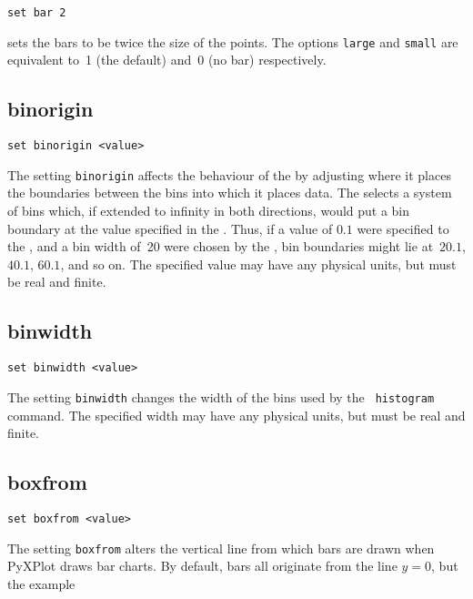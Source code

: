 \begin{verbatim}
set bar 2
\end{verbatim}

\noindent sets the bars to be twice the size of the points.  The options {\tt large} and
{\tt small} are equivalent to~1 (the default) and~0 (no bar) respectively.


\subsection{binorigin}

\begin{verbatim}
set binorigin <value>
\end{verbatim}

The setting {\tt binorigin} affects the behaviour of the  by
adjusting where it places the boundaries between the bins into which it places
data. The  selects a system of bins which, if extended to
infinity in both directions, would put a bin boundary at the value specified in
the . Thus, if a value of $0.1$ were specified to the
, and a bin width of~20 were chosen by the
, bin boundaries might lie at~$20.1$, $40.1$, $60.1$, and so
on. The specified value may have any physical units, but must be real and
finite.


\subsection{binwidth}

\begin{verbatim}
set binwidth <value>
\end{verbatim}

The setting {\tt binwidth} changes the width of the bins used by the {\tt
histogram} command. The specified width may have any physical units, but must
be real and finite.


\subsection{boxfrom}

\begin{verbatim}
set boxfrom <value>
\end{verbatim}

The setting {\tt boxfrom} alters the vertical line from which bars are drawn
when PyXPlot draws bar charts.  By default, bars all originate from the line
$y=0$, but the example

